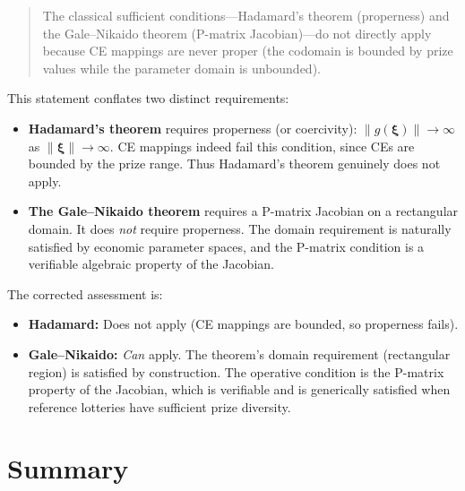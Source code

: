 \documentclass[11pt,a4paper]{article}
\theoremstyle{definition}
\newcommand{\bxi}{\boldsymbol{\xi}}
\begin{document}
\begin{quote}
The classical sufficient conditions---Hadamard's theorem (properness) and the
Gale--Nikaido theorem (P-matrix Jacobian)---do not directly apply because CE
mappings are never proper (the codomain is bounded by prize values while the
parameter domain is unbounded).
\end{quote}

This statement conflates two distinct requirements:
\begin{itemize}
    \item \textbf{Hadamard's theorem} requires properness (or coercivity):
    $\|g(\bxi)\| \to \infty$ as $\|\bxi\| \to \infty$. CE mappings indeed
    fail this condition, since CEs are bounded by the prize range. Thus
    Hadamard's theorem genuinely does not apply.

    \item \textbf{The Gale--Nikaido theorem} requires a P-matrix Jacobian on
    a rectangular domain. It does \emph{not} require properness. The domain
    requirement is naturally satisfied by economic parameter spaces, and the
    P-matrix condition is a verifiable algebraic property of the Jacobian.
\end{itemize}

The corrected assessment is:
\begin{keyresult}
\begin{itemize}
    \item \textbf{Hadamard:} Does not apply (CE mappings are bounded, so
    properness fails).
    \item \textbf{Gale--Nikaido:} \emph{Can} apply. The theorem's domain
    requirement (rectangular region) is satisfied by construction. The
    operative condition is the P-matrix property of the Jacobian, which is
    verifiable and is generically satisfied when reference lotteries have
    sufficient prize diversity.
\end{itemize}
\end{keyresult}


\section{Summary}
\label{sec:summary}
\end{document}
